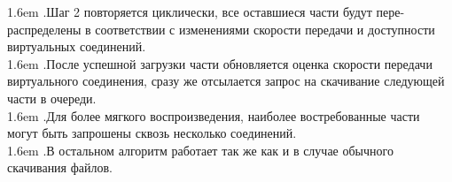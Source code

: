 \documentclass[10pt,a4paper]{article}
\begin{document}
\hangindent 1.6em
.\quad Шаг 2 повторяется циклически, все оставшиеся части будут пере-распределены в соответствии с изменениями скорости передачи и доступности виртуальных соединений.
\vspace{-0.8em}
\\ 

\hangindent 1.6em
.\quad После успешной загрузки части обновляется оценка скорости передачи виртуального соединения, сразу же отсылается запрос на скачивание следующей части в очереди.
\vspace{-0.8em}
\\ 

\hangindent 1.6em
.\quad  Для более мягкого воспроизведения, наиболее востребованные части могут быть запрошены сквозь несколько соединений.
\vspace{-0.8em}
\\ 

\hangindent 1.6em
.\quad  В остальном алгоритм работает так же как и в случае обычного скачивания файлов.
\vspace{-0.5em}
\\ 
\end{document}
